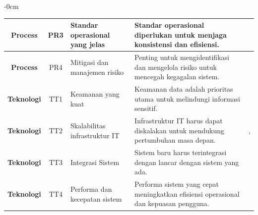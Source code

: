 \documentclass[journal,article,submit,pdftex,moreauthors]{Definitions/mdpi}
\begin{document}
\begin{table}[h!]
\begin{adjustwidth}{-\extralength}{0cm}
\begin{tabular}{c|c|p{4cm}|p{6cm}|c}
        \midrule
        \textbf{Process} & PR3 & \raggedright Standar operasional yang jelas & \raggedright Standar operasional diperlukan untuk menjaga konsistensi dan efisiensi. & \cite{salu-csf} \\ 
        \midrule
        \textbf{Process} & PR4 & \raggedright Mitigasi dan manajemen risiko & \raggedright Penting untuk mengidentifikasi dan mengelola risiko untuk mencegah kegagalan sistem. & \cite{falisat-csf} \\ 
        \midrule
        \textbf{Teknologi} & TT1 & \raggedright Keamanan yang kuat & \raggedright Keamanan data adalah prioritas utama untuk melindungi informasi sensitif. & \cite{falisat-csf} \\ 
        \midrule
        \textbf{Teknologi} & TT2 & \raggedright Skalabilitas infrastruktur IT & \raggedright Infrastruktur IT harus dapat diskalakan untuk mendukung pertumbuhan masa depan. & \cite{Ghafari-csf}, \cite{salu-csf} \\ 
        \midrule
        \textbf{Teknologi} & TT3 & \raggedright Integrasi Sistem & \raggedright Sistem baru harus terintegrasi dengan lancar dengan sistem yang ada. & \cite{Ghafari-csf} \\ 
        \midrule
        \textbf{Teknologi} & TT4 & \raggedright Performa dan kecepatan sistem & \raggedright Performa sistem yang cepat meningkatkan efisiensi operasional dan kepuasan pengguna. & \cite{Ghafari-csf} \\ 
        \bottomrule
    \end{tabular}
\end{adjustwidth}
\end{table}

\end{document}
